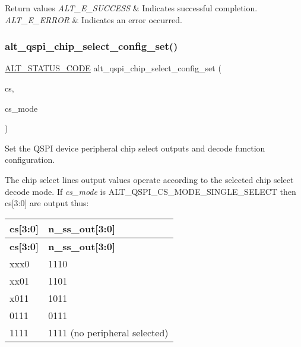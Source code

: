 \begin{DoxyRetVals}{Return values}
{\em A\+L\+T\+\_\+\+E\+\_\+\+S\+U\+C\+C\+E\+SS} & Indicates successful completion. \\
\hline
{\em A\+L\+T\+\_\+\+E\+\_\+\+E\+R\+R\+OR} & Indicates an error occurred. \\
\hline
\end{DoxyRetVals}
\mbox{\label{group__ALT__QSPI__DEV__CFG_ga26f3a0e03cc1bca6f76c1fb6c1195864}} 
\subsubsection{\texorpdfstring{alt\_qspi\_chip\_select\_config\_set()}{alt\_qspi\_chip\_select\_config\_set()}}
{\footnotesize\ttfamily \mbox{\hyperlink{hwlib_8h_abdb0d369f069723ca55d6c94bcaaaa12}{A\+L\+T\+\_\+\+S\+T\+A\+T\+U\+S\+\_\+\+C\+O\+DE}} alt\+\_\+qspi\+\_\+chip\+\_\+select\+\_\+config\+\_\+set (\begin{DoxyParamCaption}\item[{const uint32\+\_\+t}]{cs,  }\item[{const \mbox{\hyperlink{group__ALT__QSPI__DEV__CFG_gaffe96455cbf44fb3adb844c576c045fe}{A\+L\+T\+\_\+\+Q\+S\+P\+I\+\_\+\+C\+S\+\_\+\+M\+O\+D\+E\+\_\+t}}}]{cs\+\_\+mode }\end{DoxyParamCaption})}

Set the Q\+S\+PI device peripheral chip select outputs and decode function configuration.

The chip select lines output values operate according to the selected chip select decode mode. If {\itshape cs\+\_\+mode} is A\+L\+T\+\_\+\+Q\+S\+P\+I\+\_\+\+C\+S\+\_\+\+M\+O\+D\+E\+\_\+\+S\+I\+N\+G\+L\+E\+\_\+\+S\+E\+L\+E\+CT then cs\mbox{[}3\+:0\mbox{]} are output thus\+:

\tabulinesep=1mm
\begin{longtabu}spread 0pt [c]{*{2}{|X[-1]}|}
\hline
\cellcolor{\tableheadbgcolor}\textbf{ cs\mbox{[}3\+:0\mbox{]}  }&\cellcolor{\tableheadbgcolor}\textbf{ n\+\_\+ss\+\_\+out\mbox{[}3\+:0\mbox{]}   }\\
\endfirsthead
\hline
\endfoot
\hline
\cellcolor{\tableheadbgcolor}\textbf{ cs\mbox{[}3\+:0\mbox{]}  }&\cellcolor{\tableheadbgcolor}\textbf{ n\+\_\+ss\+\_\+out\mbox{[}3\+:0\mbox{]}   }\\
\endhead
xxx0  &1110   \\
xx01  &1101   \\
x011  &1011   \\
0111  &0111   \\
1111  &1111 (no peripheral selected)   \\
\end{longtabu}



